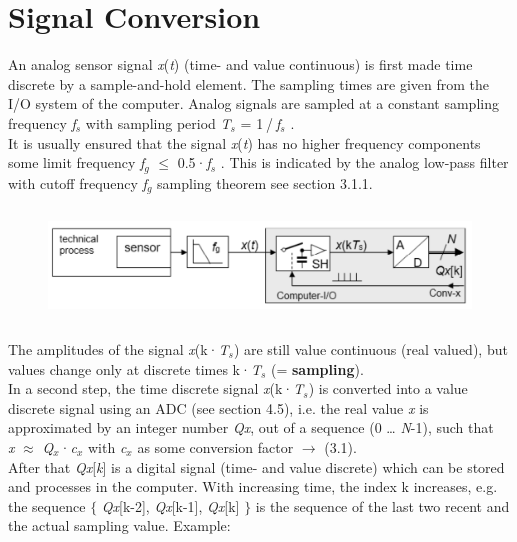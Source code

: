 \section{Signal Conversion}

An analog sensor signal \textit{x}(\textit{t}) (time- and value continuous) is first made time discrete by a sample-and-hold element. The sampling times are given from the I/O system of the computer. Analog signals are sampled at a constant sampling frequency \textit{f${}_{s}$} with sampling period \textit{T${}_{s}$} = 1${}_{\ }$/${}_{\ }$\textit{f${}_{s}$} .\\

It is usually ensured that the signal \textit{x}(\textit{t}) has no higher frequency components some limit frequency \textit{f${}_{g}$} $\mathrm{\le}$ 0.5·\textit{f${}_{s}$} . This is indicated by the analog low-pass filter with cutoff frequency \textit{f${}_{g}$}  sampling theorem see section 3.1.1.

    \begin{figure}[h]
    \centering
    \includegraphics[width=15cm, height=3cm]{Images/image137.png}
    \label{fig:Fig 88}
    \end{figure}

The amplitudes of the signal \textit{x}(k·\textit{T${}_{s}$}) are still value continuous (real valued), but values change only at discrete times k·\textit{T${}_{s}$} (= \textbf{sampling}).\\

In a second step, the time discrete signal \textit{x}(k·\textit{T${}_{s}$}) is converted into a value discrete signal using an ADC (see section 4.5), i.e. the real value \textit{x} is approximated by an integer number \textit{Qx}, out of a sequence (0 {\dots} \textit{N}-1), such that \\

\textit{x} $\mathrm{\approx}$ \textit{Q${}_{x}$}·\textit{c${}_{x}$}       with \textit{c${}_{x}$} as some conversion factor  $\rightarrow$ (3.1).\\

After that \textit{Qx}[\textit{k}] is a digital signal (time- and value discrete) which can be stored and processes in the computer. With increasing time, the index k increases, e.g. the sequence $\mathrm{\{}$ \textit{Qx}[k-2], \textit{Qx}[k-1], \textit{Qx}[k] $\mathrm{\}}$ is the sequence of the last two recent and the actual sampling value. Example:\\

